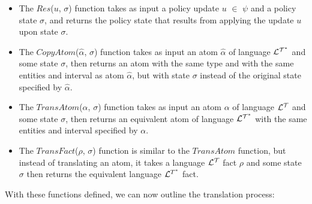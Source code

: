 \documentclass[11pt]{report}
\begin{document}
          \begin{itemize}

            \item
              The $Res$($u$, $\sigma$) function takes as input a policy update
              $u$ $\in$ $\psi$ and a policy state $\sigma$, and returns the
              policy state that results from applying the update $u$ upon
              state $\sigma$.

            \item
              The $CopyAtom$($\hat{\alpha}$, $\sigma$) function takes as input
              an atom $\hat{\alpha}$ of language ${\cal L^{T^*}}$ and some
              state $\sigma$, then returns an atom with the same type and with
              the same entities and interval as atom $\hat{\alpha}$, but with
              state $\sigma$ instead of the original state specified by
              $\hat{\alpha}$.

            \item
              The $TransAtom$($\alpha$, $\sigma$) function takes as input an
              atom $\alpha$ of language ${\cal L^T}$ and some state $\sigma$,
              then returns an equivalent atom of language ${\cal L^{T^*}}$
              with the same entities and interval specified by $\alpha$.

            \item
              The $TransFact$($\rho$, $\sigma$) function is similar to the
              $TransAtom$ function, but instead of translating an atom, it
              takes a language ${\cal L^T}$ fact $\rho$ and some state $\sigma$
              then returns the equivalent language ${\cal L}^{T^*}$ fact.
          \end{itemize}

          With these functions defined, we can now outline the translation
          process:
\end{document}
